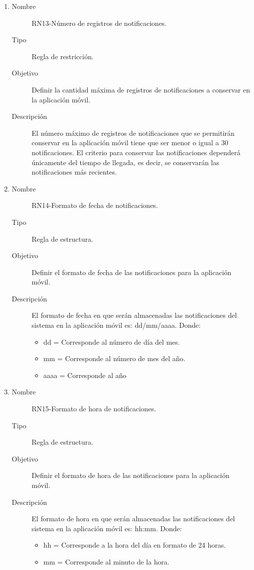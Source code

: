 \begin{enumerate}[label=RN\arabic*.]
\item \label{RN13}
		\begin{description}
			\item[Nombre] RN13-Número de registros de notificaciones.
			\item[Tipo] Regla de restricción.
			\item[Objetivo] Definir la cantidad máxima de registros de notificaciones a conservar en la aplicación móvil.
			\item[Descripción] El número máximo de registros de notificaciones que se permitirán conservar en la aplicación móvil tiene que ser menor o igual a 30 notificaciones. El criterio para conservar las notificaciones dependerá únicamente del tiempo de llegada, es decir, se conservarán las notificaciones más recientes.   
		\end{description}
		
\item \label{RN14}
		\begin{description}
			\item[Nombre] RN14-Formato de fecha de notificaciones.
			\item[Tipo] Regla de estructura.
			\item[Objetivo] Definir el formato de fecha de las notificaciones para la aplicación móvil.
			\item[Descripción] El formato de fecha en que serán almacenadas las notificaciones del sistema en la aplicación móvil es: dd/mm/aaaa.
			Donde:
			\begin{itemize}
		 		\item dd = Corresponde al número de día del mes.
		 		\item mm = Corresponde al número de mes del año.
		 		\item aaaa = Corresponde al año
		    \end{itemize}
		\end{description}
		
\item \label{RN15}
		\begin{description}
			\item[Nombre] RN15-Formato de hora de notificaciones.
			\item[Tipo] Regla de estructura.
			\item[Objetivo] Definir el formato de hora de las notificaciones para la aplicación móvil.
			\item[Descripción] El formato de hora en que serán almacenadas las notificaciones del sistema en la aplicación móvil es: hh:mm.
			Donde:
			\begin{itemize}
		 		\item hh = Corresponde a la hora del día en formato de 24 horas.
		 		\item mm = Corresponde al minuto de la hora.
		    \end{itemize}
		\end{description}


\end{enumerate}
